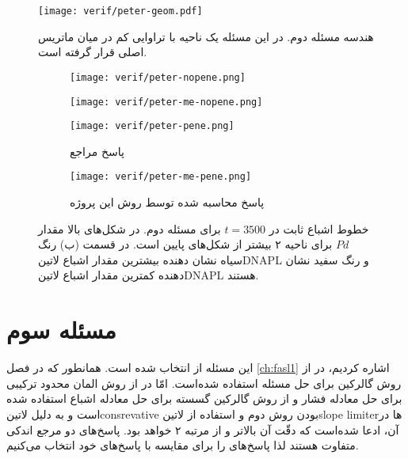 \begin{figure}
\texttt{[image: verif/peter-geom.pdf]} 
\caption[هندسه مسئله دوم]{هندسه مسئله دوم. در این مسئله یک ناحیه با تراوایی کم در میان ماتریس اصلی قرار گرفته است. }
\label{fig:4peterprob} \vspace{1cm}
\begin{subfigure}{0.5\textwidth}
\texttt{[image: verif/peter-nopene.png]} 
\end{subfigure}
\begin{subfigure}{0.5\textwidth}
\texttt{[image: verif/peter-me-nopene.png]}
\end{subfigure}
\begin{subfigure}{0.5\textwidth}
\texttt{[image: verif/peter-pene.png]} 
\caption{پاسخ مراجع \cite{basthabil,bastn}}
\label{fig:4peterres-him}
\end{subfigure}
\begin{subfigure}{0.5\textwidth}
\texttt{[image: verif/peter-me-pene.png]} 
\caption{پاسخ محاسبه شده توسط روش این پروژه}
\label{fig:4peterres-me}
\end{subfigure}
\caption[خطوط اشباع ثابت در $t=3500$ برای مسئله دوم]{خطوط اشباع ثابت در $t=3500$ برای مسئله دوم. در شکل‌های بالا مقدار $Pd$ برای ناحیه ۲ بیشتر از شکل‌های پایین است. در قسمت (ب) رنگ سیاه نشان دهنده بیشترین مقدار اشباع \text‌لاتین{DNAPL} و رنگ سفید نشان دهنده کمترین مقدار اشباع \text‌لاتین{DNAPL} هستند.}
\label{fig:4peterres}
\end{figure}

\section{مسئله سوم}
این مسئله از \cite{hoteitf,karimi1} انتخاب شده است. همانطور که در فصل \ref{ch:fasl1} اشاره کردیم، در \cite{karimi1} از روش گالرکین برای حل مسئله استفاده شده‌است. امّا در \cite{hoteitf} از روش المان محدود ترکیبی برای حل معادله فشار و از روش گالرکین گسسته برای حل معادله اشباع استفاده شده است و به دلیل \text‌لاتین{consrevative} بودن روش دوم و استفاده از \text‌لاتین{slope limiter}ها در آن، ادعا شده‌است که دقّت آن بالاتر و از مرتبه ۲ خواهد بود. پاسخ‌های دو مرجع اندکی متفاوت هستند لذا پاسخ‌های \cite{hoteitf} را برای مقایسه با پاسخ‌های خود انتخاب می‌کنیم.

